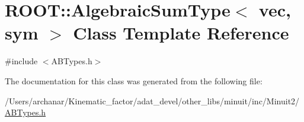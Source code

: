 \hypertarget{classROOT_1_1Minuit2_1_1AlgebraicSumType_3_01vec_00_01sym_01_4}{}\section{R\+O\+OT\+:\+:Algebraic\+Sum\+Type$<$ vec, sym $>$ Class Template Reference}
\label{classROOT_1_1Minuit2_1_1AlgebraicSumType_3_01vec_00_01sym_01_4}


{\ttfamily \#include $<$A\+B\+Types.\+h$>$}



The documentation for this class was generated from the following file\+:\begin{DoxyCompactItemize}
\item 
/\+Users/archanar/\+Kinematic\+\_\+factor/adat\+\_\+devel/other\+\_\+libs/minuit/inc/\+Minuit2/\mbox{\hyperlink{other__libs_2minuit_2inc_2Minuit2_2ABTypes_8h}{A\+B\+Types.\+h}}\end{DoxyCompactItemize}
